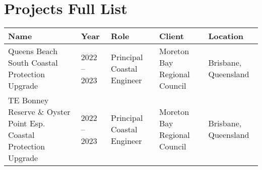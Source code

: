 \begin{sidewaystable}
\section{Projects Full List}
	\vspace{2em}
	\centering
	\footnotesize

	\setlength{\tymin}{40pt} %
	\setlength{\tabcolsep}{8pt}

	\begin{tabulary}{\textwidth}{LLLLL}
	\toprule
	\textbf{Name} &
	  \textbf{Year} &
	  \textbf{Role} &
	  \textbf{Client} &
	  \textbf{Location} \\
	\midrule
	   Queens Beach South Coastal Protection Upgrade   & 2022 -- 2023 & Principal Coastal Engineer & Moreton Bay Regional Council & Brisbane, Queensland \\ 
	   TE Bonney Reserve \& Oyster Point Esp. Coastal Protection Upgrade   & 2022 -- 2023 & Principal Coastal Engineer & Moreton Bay Regional Council & Brisbane, Queensland \\ 
	\bottomrule
	\end{tabulary}

\end{sidewaystable}

